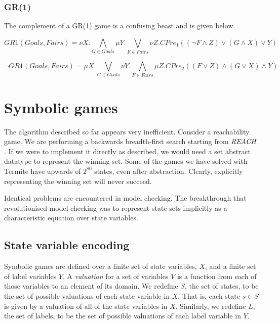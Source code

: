 \subsubsection{GR(1)}

The complement of a GR(1) game is a confusing beast and is given below.

\begin{equation}
    GR1(Goals, Fairs) = \nu X. \bigwedge_{G \in Goals} \mu Y. \bigvee_{F \in Fairs} \nu Z. CPre_1((\neg F \wedge Z) \vee (G \wedge X) \vee Y)
\end{equation}

\begin{equation}
    \neg GR1(Goals, Fairs) = \mu X. \bigvee_{G \in Goals} \nu Y. \bigwedge_{F \in Fairs} \mu Z. CPre_2((F \vee Z) \wedge (G \vee X) \wedge Y)
\end{equation}

\section{Symbolic games}
\label{sec:symbolic_games}

The algorithm described so far appears very inefficient. Consider a reachability game. We are performing a backwards breadth-first search starting from $\mathit{REACH}$. If we were to implement it directly as described, we would need a set abstract datatype to represent the winning set. Some of the games we have solved with Termite have upwards of $2^{80}$ states, even after abstraction. Clearly, explicitly representing the winning set will never succeed. 

Identical problems are encountered in model checking. The breakthrough that revolutionised model checking was to represent state sets implicitly as a characteristic equation over state variables.

\subsection{State variable encoding}

Symbolic games are defined over a finite set of state variables, $X$, and a finite set of label variables $Y$. A \emph{valuation} for a set of variables $V$ is a function from each of those variables to an element of its domain. We redefine $S$, the set of states, to be the set of possible valuations of each state variable in $X$. That is, each state $s \in S$ is given by a valuation of all of the state variables in $X$. Similarly, we redefine $L$, the set of labels, to be the set of possible valuations of each label variable in $Y$.

